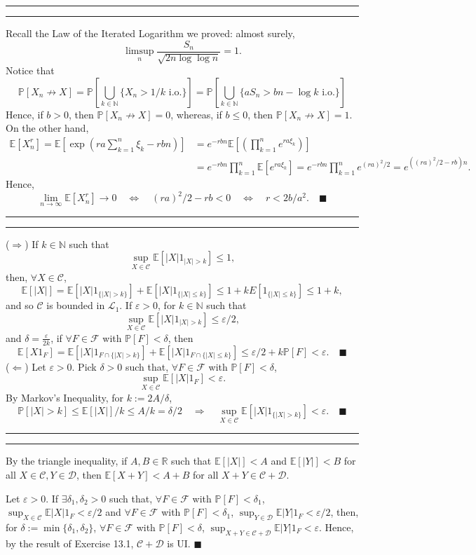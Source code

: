 \documentclass[11pt]{article}
\newcounter{questionCounter}
\newcounter{partCounter}[questionCounter]
\newenvironment{question}[2][\arabic{questionCounter}]{%
    \setcounter{partCounter}{0}%
    \vspace{.25in} \hrule \vspace{0.5em}%
        \noindent{\bf #2}%
    \vspace{0.8em} \hrule \vspace{.10in}%
    \addtocounter{questionCounter}{1}%
}{}
\renewcommand{\qed}{\quad \ensuremath{\blacksquare}}
\newcommand{\E}{\mathbb{E}} %
\newcommand{\N}{\mathbb{N}} %
\newcommand{\R}{\mathbb{R}} %
\newcommand{\C}{\mathcal{C}} %
\newcommand{\F}{\mathcal{F}} %
\renewcommand{\L}{\mathcal{L}} %
\newcommand{\e}{\varepsilon} %
\renewcommand{\P}{\mathbb{P}}   %
\begin{document}
\begin{question}{EA13.2}
Recall the Law of the Iterated Logarithm we proved: almost surely,
\[\limsup_n \frac{S_n}{\sqrt{2n \log \log n}} = 1.\]
Notice that
\[\P[X_n \not\to X]
    = \P\left[ \bigcup_{k \in \N} \{ X_n > 1/k \mbox{ i.o.}\} \right]
    = \P\left[ \bigcup_{k \in \N} \{ aS_n > bn - \log k \mbox{ i.o.}\} \right]
\]
Hence, if $b > 0$, then $\P[X_n \not\to X] = 0$, whereas, if $b \leq 0$, then
$\P[X_n \not\to X] = 1$. On the other hand,
\begin{align*}
\E[X_n^r]
    = \E \left[ \exp \left( ra\sum_{k = 1}^n \xi_k - rbn \right) \right]
 &  = e^{-rbn}\E \left[ \left( \prod_{k = 1}^n e^{ra\xi_k} \right) \right]  \\
 &  = e^{-rbn} \prod_{k = 1}^n \E[e^{ra\xi_k}]
    = e^{-rbn} \prod_{k = 1}^n e^{(ra)^2/2}
    = e^{((ra)^2/2 - rb)n}.
\end{align*}
Hence,
\[\lim_{n \to \infty} \E[X_n^r] \to 0
    \quad \Leftrightarrow \quad (ra)^2/2 - rb < 0
    \quad \Leftrightarrow \quad r < 2b/a^2. \qed\]
\end{question}

\begin{question}{E13.1}
($\Rightarrow$) If $k \in \N$ such that
\[\sup_{X \in \C} \E \left[ |X|1_{|X| > k} \right] \leq 1,\]
then, $\forall X \in \C$,
\[\E[|X|]
    = \E[|X|1_{\{|X| > k\}}] + \E[|X|1_{\{|X| \leq k\}}]
    \leq 1 + kE[1_{\{|X| \leq k\}}]
    \leq 1 + k,
\]
and so $\C$ is bounded in $\L_1$. If $\e > 0$, for $k \in \N$ such that
\[\sup_{X \in \C} \E \left[ |X|1_{|X| > k} \right] \leq \e/2,\]
and $\delta = \frac{\e}{2k}$, if $\forall F \in \F$ with $\P[F] < \delta$, then
\[\E[X1_F]
    = \E[|X|1_{F \cap \{|X| > k\}}] + \E[|X|1_{F \cap \{|X| \leq k\}}]
    \leq \e/2 + k\P[F]
    < \e. \qed
\]
($\Leftarrow$) Let $\e > 0$. Pick $\delta > 0$ such that, $\forall F \in \F$
with $\P[F] < \delta$,
\[\sup_{X \in \C} \E[|X|1_F] < \e.\]
By Markov's Inequality, for $k := 2A/\delta$,
\[\P[|X| > k] \leq \E[|X|]/k \leq A/k = \delta/2
    \quad \Rightarrow \quad
    \sup_{X \in \C} \E[|X|1_{\{|X| > k\}}] < \e. \qed
\]
\end{question}

\begin{question}{E13.2}
\newcommand{\D}{\mathcal{D}}
By the triangle inequality, if $A,B \in \R$ such that $\E[|X|] < A$ and
$\E[|Y|] < B$ for all $X \in \C, Y \in \D$, then $\E[X + Y] < A + B$
for all $X + Y \in \C + \D$.

Let $\e > 0$. If $\exists \delta_1,\delta_2 > 0$ such that, $\forall F \in \F$
with $\P[F] < \delta_1$, $\sup_{X \in \C} \E|X|1_F < \e/2$ and
$\forall F \in \F$ with $\P[F] < \delta_1$, $\sup_{Y \in \D} \E|Y|1_F < \e/2$,
then, for $\delta := \min\{\delta_1,\delta_2\}$, $\forall F \in \F$ with
$\P[F] < \delta$, $\sup_{X + Y \in \C + \D} \E|Y|1_F < \e$. Hence, by the
result of Exercise 13.1, $\C + \D$ is UI. \qed
\end{question}
\end{document}
